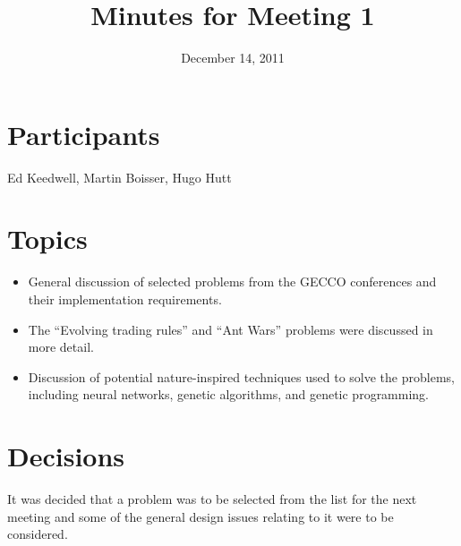 \documentclass[a4paper, 11pt]{article}
\title{Minutes for Meeting 1}
\date{December 14, 2011}
\begin{document}
\maketitle

\section{Participants}

Ed Keedwell, Martin Boisser, Hugo Hutt

\section{Topics}

\begin{itemize}
\item General discussion of selected problems from the GECCO
  conferences and their implementation requirements.
\item The ``Evolving trading rules'' and ``Ant Wars'' problems were
  discussed in more detail.
\item Discussion of potential nature-inspired techniques used to solve
  the problems, including neural networks, genetic algorithms, and
  genetic programming.
\end{itemize}

\section{Decisions}

It was decided that a problem was to be selected from the list for the
next meeting and some of the general design issues relating to it were
to be considered.
\end{document}
